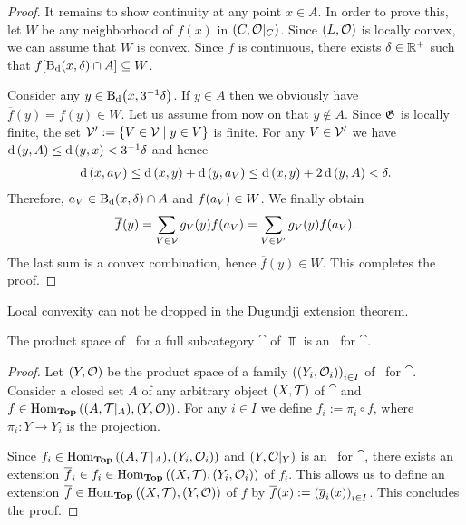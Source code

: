 \begin{proof}
	It remains to show continuity at any point $x \in A$. In order to prove this, let $W$ be any neighborhood of $f(x)$ in $\reltspace[C][O]$. Since $\tspace[L][O]$ is locally convex, we can assume \Wlog that $W$ is convex. Since $f$ is continuous, there exists $\delta \in \R^+$ such that $f\bbraces{\ball[x][\delta][\metric] \cap A} \subseteq W$.
	
	Consider any $y \in \ball[x][3^{-1}\delta][\metric]$. If $y \in A$ then we obviously have $\overline{f}(y) = f(y) \in W$. Let us assume from now on that $y \notin A$. Since $\partition[G]$ is locally finite, the set $\cover[V]^\prime := \Bbraces{V \in \cover[V] \mid y \in V}$ is finite. For any $V \in \cover[V]^\prime$ we have $\metric\pbraces{y, A} \leq \metric\pbraces{y, x} < 3^{-1}\delta$ and hence
	\begin{align*}
		\metric\pbraces{x, a_V} \leq \metric\pbraces{x, y} + \metric\pbraces{y, a_V} \leq \metric\pbraces{x, y} + 2 \metric\pbraces{y, A} < \delta.
	\end{align*}
	Therefore, $a_V \in \ball[x][\delta][\metric] \cap A$ and $f\pbraces{a_V} \in W$. We finally obtain
	\begin{align*}
		\overline{f}(y) = \sum_{V \in \cover[V]} g_V(y) f(a_V) = \sum_{V \in \cover[V]^\prime} g_V(y) f(a_V).
	\end{align*}
	The last sum is a convex combination, hence $\overline{f}(y) \in W$. This completes the proof. 
\end{proof}

\begin{remark}
	Local convexity can not be dropped in the Dugundji extension theorem.\cite[remark1.2.4]{IDT}
\end{remark}

\begin{proposition}
	The product space of \aexs\ for a full subcategory $\cat$ of $\Top$ is an \aex\ for $\cat$. 
\end{proposition}
\begin{proof}
	Let $\tspace[Y][O]$ be the product space of a family $\pbraces{\indtspace[Y][O]}_{i \in I}$ of \aexs\ for $\cat$. Consider a closed set $A$ of any arbitrary object $\tspace$ of $\cat$ and $f \in \Hom_\Top\pbraces{\reltspace, \tspace[Y][O]}$. For any $i \in I$ we define $f_i := \pi_i \circ f$, where $\pi_i: Y \to Y_i$ is the projection. 
	Since $f_i \in \Hom_\Top\pbraces{\reltspace, \indtspace[Y][O]}$ and $\reltspace[Y][O]$ is an \aex\ for $\cat$, there exists an extension $\overline{f}_i \in f_i \in \Hom_\Top\pbraces{\tspace, \indtspace[Y][O]}$ of $f_i$. This allows us to define an extension $\overline{f} \in \Hom_\Top\pbraces{\tspace, \tspace[Y][O]}$ of $f$ by $\overline{f}(x) := \pbraces{\overline{g}_i(x)}_{i \in I}$. This concludes the proof. 
\end{proof}
